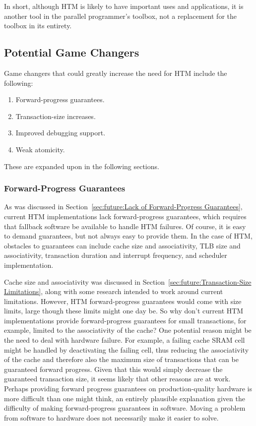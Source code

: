In short, although HTM is likely to have important uses and applications,
it is another tool in the parallel programmer's toolbox, not a replacement
for the toolbox in its entirety.

\subsection{Potential Game Changers}
\label{sec:future:Potential Game Changers}

Game changers that could greatly increase the need for HTM include
the following:

\begin{enumerate}
\item	Forward-progress guarantees.
\item	Transaction-size increases.
\item	Improved debugging support.
\item	Weak atomicity.
\end{enumerate}

These are expanded upon in the following sections.

\subsubsection{Forward-Progress Guarantees}
\label{sec:future:Forward-Progress Guarantees}

As was discussed in
Section~\ref{sec:future:Lack of Forward-Progress Guarantees},
current HTM implementations lack forward-progress guarantees, which requires
that fallback software be available to handle HTM failures.
Of course, it is easy to demand guarantees, but not always easy
to provide them.
In the case of HTM, obstacles to guarantees can include cache size and
associativity, TLB size and associativity, transaction duration and
interrupt frequency, and scheduler implementation.

Cache size and associativity was discussed in
Section~\ref{sec:future:Transaction-Size Limitations},
along with some research intended to work around current limitations.
However, HTM forward-progress guarantees would
come with size limits, large though these limits might one day be.
So why don't current HTM implementations provide forward-progress
guarantees for small transactions, for example, limited to the
associativity of the cache?
One potential reason might be the need to deal with hardware failure.
For example, a failing cache SRAM cell might be handled by deactivating
the failing cell, thus reducing the associativity of the cache and
therefore also the maximum size of transactions that can be guaranteed
forward progress.
Given that this would simply decrease the guaranteed transaction size,
it seems likely that other reasons are at work.
Perhaps providing forward progress guarantees on production-quality
hardware is more difficult than one might think, an entirely plausible
explanation given the difficulty of making forward-progress guarantees
in software.
Moving a problem from software to hardware does not necessarily make
it easier to solve.

